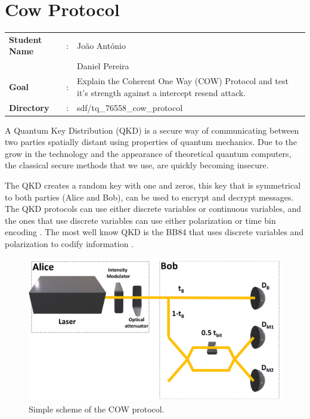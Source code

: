 \clearpage
\section{Cow Protocol}

\begin{refsection}

\begin{tcolorbox}	
\begin{tabular}{p{2.75cm} p{0.2cm} p{10.5cm}} 	
\textbf{Student Name}  &:&  Jo\~ao Ant\'onio\\
\textbf{}  & &  Daniel Pereira\\
\textbf{Goal}          &:& Explain the Coherent One Way (COW) Protocol and test it's strength against a intercept resend attack.\\
\textbf{Directory}     &:& sdf/tq\_76558\_cow\_protocol
\end{tabular}
\end{tcolorbox}

A Quantum Key Distribution (QKD) is a secure way of communicating between two parties spatially distant using properties of quantum mechanics. Due to the grow in the technology and the appearance of theoretical quantum computers, the classical secure methods that we use, are quickly becoming insecure.

The QKD creates a random key with one and zeros, this key that is symmetrical to both parties (Alice and Bob), can be used to encrypt and decrypt messages. The QKD protocols can use either discrete variables or continuous variables, and the ones that use discrete variables can use either polarization or time bin encoding \cite{singh}. The most well know QKD is the BB84 that uses discrete variables and polarization to codify information \cite{bennett1992quantum}.

\begin{figure}[h]
\centering
\includegraphics[width=1\linewidth]{./sdf/tq_76558_cow_protocol/slides/figures/Full2.pdf}
\caption{Simple scheme of the COW protocol.}
\label{fig:Scheme}
\end{figure}


\end{refsection}
